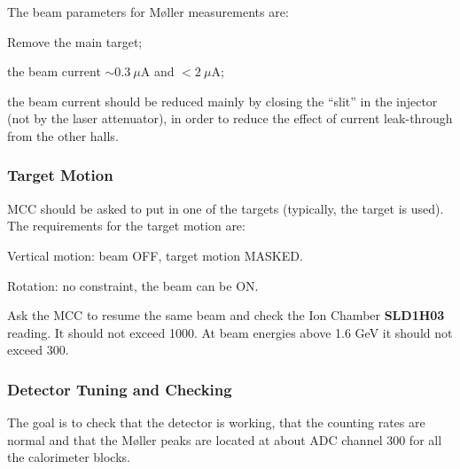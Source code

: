 { The beam parameters for M{\o}ller measurements
 are: 
   \begin{list}{--}{\setlength{\itemsep}{-0.15cm}}        
     \item Remove the main target;
     \item \begin{safetyen}{5}{0} the beam current $\sim{}0.3~\mu$A and $<2~\mu$A;
            \end{safetyen}
     \item the beam current should be reduced mainly by closing the ``slit''
           in the injector (not by the laser attenuator), in order to
           reduce the effect of current leak-through from the other halls.
   \end{list}


\subsubsection {Target Motion}
\label{sec:moller_oper_target}
 MCC should be asked to put in one of the targets (typically, the 
 target is used). The requirements for the target motion are:
 \begin{safetyen}{10}{10}
    \begin{list}{--}{\setlength{\itemsep}{-0.15cm}}
       \item Vertical motion: beam OFF, target motion MASKED.
       \item Rotation: no constraint, the beam can be ON. 
    \end{list}
 \end{safetyen}

 Ask the MCC to resume the same beam and check the Ion Chamber
 {\bf SLD1H03} reading. It should not exceed 1000. At beam energies
 above 1.6 GeV it should not exceed 300.

\subsubsection{Detector Tuning and Checking }
\label{sec:dettune}

The goal is to check that the detector is working, that the counting rates
are normal and that the M{\o}ller peaks are located at about ADC channel 300
for all the calorimeter blocks.

}
